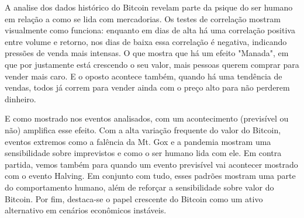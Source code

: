 A analise dos dados histórico do Bitcoin revelam parte da psique do ser humano em relação a como se lida com mercadorias. 
Os testes de correlação mostram visualmente como funciona: enquanto em dias de alta há uma correlação positiva entre volume e retorno, nos dias de baixa essa correlação é negativa, indicando pressões de venda mais intensas. O que mostra que há um efeito "Manada", em que por justamente está crescendo o seu valor, mais pessoas querem comprar para vender mais caro. E o oposto acontece também, quando há uma tendência  de vendas, todos já correm para vender ainda com o preço alto para não perderem dinheiro. 

E como mostrado nos eventos analisados, com um acontecimento (previsível ou não) amplifica esse efeito. Com a alta variação frequente do valor do Bitcoin, eventos extremos como a falência da Mt. Gox e a pandemia mostram uma sensibilidade sobre imprevistos e como o ser humano lida com ele. Em contra partida, vemos também para quando um evento previsível vai acontecer mostrado com o evento Halving.
Em conjunto com tudo, esses padrões mostram uma parte do comportamento humano, além de reforçar a sensibilidade sobre valor do Bitcoin.
Por fim, destaca-se o papel crescente do Bitcoin como um ativo alternativo em cenários econômicos instáveis.
